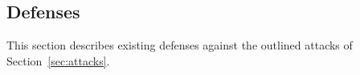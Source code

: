 \subsection{Defenses}
\label{sec:defenses}
This section describes existing defenses against the outlined attacks of Section~\ref{sec:attacks}.






